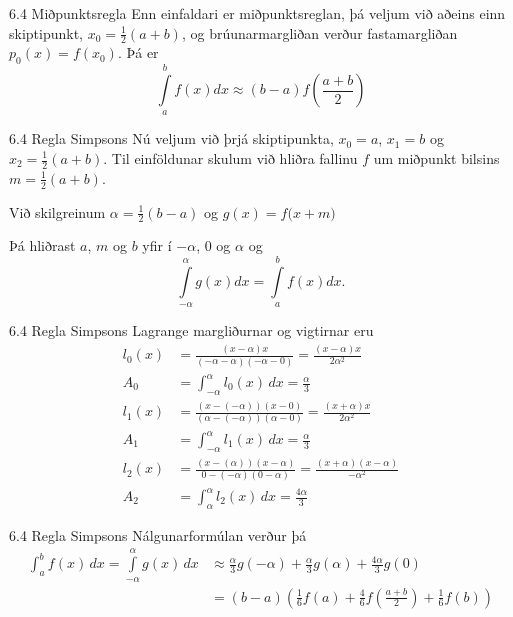 \begin{frame}{6.4 Miðpunktsregla} 
Enn einfaldari er miðpunktsreglan, þá veljum við aðeins einn skiptipunkt, 
$x_0 = \frac{1}{2}(a+b)$, og brúunarmargliðan verður fastamargliðan 
$p_0(x) = f(x_0)$. Þá er
\begin{equation*}
  \int\limits_a^b f(x) dx \approx (b-a)f\left(\frac{a+b}{2}\right)
\end{equation*}
\end{frame}


\begin{frame}{6.4 Regla Simpsons} 
Nú veljum við þrjá skiptipunkta, $x_0 = a$, $x_1 = b$ og $x_2 =
\frac{1}{2}(a+b)$. Til einföldunar skulum við hliðra fallinu $f$
um miðpunkt bilsins $m=\tfrac{1}{2}(a+b)$.

\smallskip
Við skilgreinum $\alpha=\tfrac 12(b-a)$ og 
$g(x) = f\big(x+m\big)$

\pause
Þá hliðrast $a$, $m$ og $b$ yfir í $-\alpha$, $0$ og $\alpha$ og 
\begin{equation*}
  \int\limits_{-\alpha}^{\alpha} g(x) dx = 
  \int\limits_a^b f(x) dx.
\end{equation*}
\end{frame}


\begin{frame}{6.4 Regla Simpsons} 
Lagrange margliðurnar og vigtirnar eru
\begin{align*}
  l_0(x) &= \frac{(x-\alpha)x}{(-\alpha-\alpha)(-\alpha - 0)} 
  = \frac{(x-\alpha)x}{2\alpha^2} \\
  A_0 &= \int_{-\alpha}^{\alpha} l_0(x)\,dx = \frac{\alpha}{3} \\
  l_1(x) &= \frac{(x-(-\alpha))(x-0)}{(\alpha - ( -\alpha))(\alpha - 0)}
  = \frac{(x+\alpha)x}{2\alpha^2}\\
  A_1 &= \int_{-\alpha}^{\alpha} l_1(x)\,dx = \frac{\alpha}{3}\\
  l_2(x) &= \frac{(x-(\alpha))(x-\alpha)}{0-(-\alpha)(0-\alpha)}
  = \frac{(x+\alpha)(x-\alpha)}{-\alpha^2}\\
  A_2 &= \int_{\alpha}^{\alpha} l_2(x)\,dx = \frac{4\alpha}{3}
\end{align*}
\end{frame}


\begin{frame}{6.4 Regla Simpsons} 
Nálgunarformúlan verður þá
\begin{align*}
  \int_a^b f(x) \, dx = \int\limits_{-\alpha}^{\alpha} g(x) \, dx
  &\approx \frac{\alpha}{3}g(-\alpha) + \frac{\alpha}{3}g(\alpha) 
  + \frac{4\alpha}{3}g(0)\\
  &=(b-a)\left( \frac{1}{6}f(a) + \frac{4}{6}f
    \left( \frac{a+b}{2}\right) + \frac{1}{6} f(b)  \right)
\end{align*}
\end{frame}


